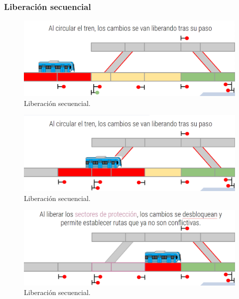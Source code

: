 \subsubsection{Liberación secuencial}

\lipsum[1]

    \begin{figure}[!h]
        \centering
        \includegraphics[width=1\textwidth]{Figuras/secuencial_1}
        \centering\caption{Liberación secuencial.}
        \label{fig:secuencial_1}
    \end{figure}
    
\lipsum[1]

    \begin{figure}[!h]
        \centering
        \includegraphics[width=1\textwidth]{Figuras/secuencial_2}
        \centering\caption{Liberación secuencial.}
        \label{fig:secuencial_2}
    \end{figure}
    
\lipsum[1]

    \begin{figure}[!h]
        \centering
        \includegraphics[width=1\textwidth]{Figuras/secuencial_3}
        \centering\caption{Liberación secuencial.}
        \label{fig:secuencial_3}
    \end{figure}
    
